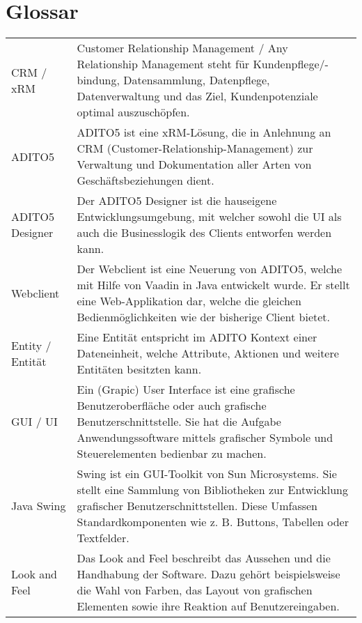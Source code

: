 \section{Glossar}
\begin{center}
	\begin{tabularx}{\textwidth}{p{}|X}
	    CRM / xRM & 
		Customer Relationship Management / Any Relationship Management
	  	steht für Kundenpflege/-bindung, Datensammlung, Datenpflege, Datenverwaltung und das Ziel, Kundenpotenziale optimal auszuschöpfen. \\ 
	  	ADITO5 &
	  	ADITO5 ist eine xRM-Lösung, die in Anlehnung an CRM (Customer-Relationship-Management)
	  	zur Verwaltung und Dokumentation aller Arten von Geschäftsbeziehungen dient. \\
	  	ADITO5 Designer &
	  	Der ADITO5 Designer ist die hauseigene Entwicklungsumgebung, mit welcher sowohl die UI als
	  	auch die Businesslogik des Clients entworfen werden kann. \\
	  	Webclient &
	  	Der Webclient ist eine Neuerung von ADITO5, welche mit Hilfe von Vaadin in Java entwickelt wurde. Er stellt eine Web-Applikation dar, welche die gleichen Bedienmöglichkeiten wie der bisherige Client bietet. \\
	  	Entity / Entität &
	  	Eine Entität entspricht im ADITO Kontext einer Dateneinheit, welche Attribute, Aktionen und weitere Entitäten besitzten kann. \\
	  	GUI / UI &
	  	Ein (Grapic) User Interface ist eine grafische Benutzeroberfläche oder auch grafische Benutzerschnittstelle. Sie hat die Aufgabe Anwendungssoftware mittels grafischer Symbole und Steuerelementen bedienbar zu machen. \\
	  	Java Swing &
	  	Swing ist ein GUI-Toolkit von Sun Microsystems. Sie stellt eine Sammlung von Bibliotheken zur Entwicklung grafischer Benutzerschnittstellen. Diese Umfassen Standardkomponenten wie z. B. Buttons, Tabellen oder Textfelder. \\
	  	Look and Feel &
	  	Das Look and Feel beschreibt das Aussehen und die Handhabung der Software. Dazu gehört beispielsweise die Wahl von Farben, das Layout von grafischen Elementen sowie ihre Reaktion auf Benutzereingaben. \\
	\end{tabularx}
\end{center}